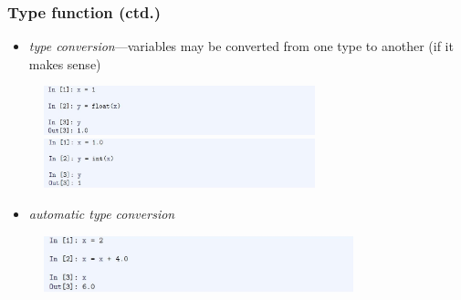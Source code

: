 \documentclass[14pt]{beamer}
\newcommand\red[1]{{\color{red} #1}}
\begin{document}
\begin{frame}[fragile]

\frametitle{Type function (ctd.)}

\vspace*{-3mm}
\begin{itemize}
	\item \red{\emph{type conversion}}---variables may be converted from one type to another (if it makes sense)
\end{itemize}
\vspace*{-3mm}
\begin{figure}[ht]
	\centering
	\includegraphics[width=0.7\textwidth]{figures/LLp43b}
	\includegraphics[width=0.7\textwidth]{figures/LLp43c}
\end{figure}

\begin{itemize}
	\item \red{\emph{automatic type conversion}}
\end{itemize}
\vspace*{-3mm}
\begin{figure}[ht]
	\centering
	\includegraphics[width=0.8\textwidth]{figures/LLp43d}
\end{figure}

\end{frame}

%
%
%
%
%
%
%
\end{document}
